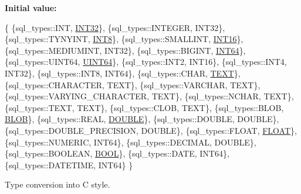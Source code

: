 {\bfseries Initial value\+:}
\begin{DoxyCode}
\{
    \{sql\_types::INT, \hyperlink{namespacesf_aee849ddcdbf3bdb22d912e4ab0c7b93fa75189b2710fdf8a9963ff24286fb3b5c}{INT32}\},
        \{sql\_types::INTEGER, INT32\},
        \{sql\_types::TYNYINT, \hyperlink{namespacesf_1_1sql__types_a37d20d6816136a66e052adb437c9cd9c}{INT8}\},
        \{sql\_types::SMALLINT, \hyperlink{namespacesf_aee849ddcdbf3bdb22d912e4ab0c7b93fa22aad51d2bcf8c2982c0062a7209b33c}{INT16}\},
        \{sql\_types::MEDIUMINT, INT32\},
        \{sql\_types::BIGINT, \hyperlink{namespacesf_aee849ddcdbf3bdb22d912e4ab0c7b93fa2c9e1474c273bc300e25ba8f0433b835}{INT64}\},
        \{sql\_types::UINT64, \hyperlink{namespacesf_1_1sql__types_a8a9315fce8742d77a4f18194d16d6d73}{UINT64}\},
        \{sql\_types::INT2, INT16\},
        \{sql\_types::INT4, INT32\},
        \{sql\_types::INT8, INT64\},
            \{sql\_types::CHAR, \hyperlink{namespacesf_1_1sql__types_a0b2ac3e64bad9d7879066990a24b2dfe}{TEXT}\},
            \{sql\_types::CHARACTER, TEXT\},
        \{sql\_types::VARCHAR, TEXT\},
        \{sql\_types::VARYING\_CHARACTER, TEXT\},
        \{sql\_types::NCHAR, TEXT\},
        \{sql\_types::TEXT, TEXT\},
        \{sql\_types::CLOB, TEXT\},
        \{sql\_types::BLOB, \hyperlink{namespacesf_1_1sql__types_a27db7db3803af68b095e51d281ba0abc}{BLOB}\},
        \{sql\_types::REAL, \hyperlink{namespacesf_1_1sql__types_af88812f4a2ee462fa1b6b1251a42d9f0}{DOUBLE}\},
        \{sql\_types::DOUBLE, DOUBLE\},
        \{sql\_types::DOUBLE\_PRECISION, DOUBLE\},
        \{sql\_types::FLOAT, \hyperlink{namespacesf_1_1sql__types_ad723fc92e8ceaf7a83acfa6c730edb6c}{FLOAT}\},
        \{sql\_types::NUMERIC, INT64\},
        \{sql\_types::DECIMAL, DOUBLE\},
        \{sql\_types::BOOLEAN, \hyperlink{namespacesf_aee849ddcdbf3bdb22d912e4ab0c7b93fae5d42c228064edbbb67745a310108ff1}{BOOL}\},
        \{sql\_types::DATE, INT64\},
        \{sql\_types::DATETIME, INT64\}
    \}
\end{DoxyCode}


Type conversion into C style. 

